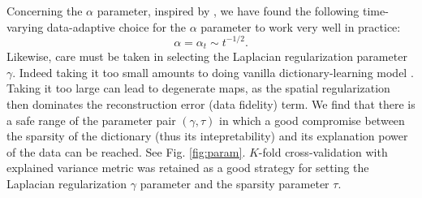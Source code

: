 Concerning the $\alpha$ parameter, inspired by   \citep{ying2006online}, we have found the following time-varying data-adaptive choice for the $\alpha$ parameter to work very well in practice:
\begin{equation}
  \alpha = \alpha_t \sim t^{-1/2}.
  \label{eq:varyingalpha}
\end{equation}
Likewise, care must be taken in selecting the Laplacian regularization parameter $\gamma$. Indeed taking it too small amounts to doing vanilla dictionary-learning model   \citep{mairal2010}. Taking it too large can lead to degenerate maps, as the spatial regularization then dominates the reconstruction error (data fidelity) term.
We find that there is a safe range of the parameter pair $(\gamma, \tau)$ in which a good compromise between the sparsity of the dictionary (thus its intepretability) and its explanation power of the data can be reached. See Fig. \ref{fig:param}.
$K$-fold cross-validation with explained variance metric
was retained as a good strategy for setting the Laplacian regularization $\gamma$ parameter and the sparsity parameter $\tau$.




